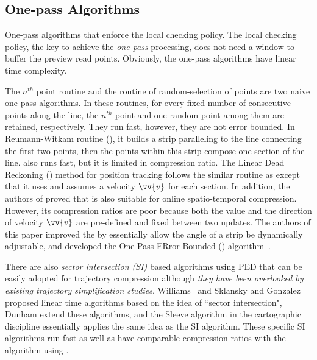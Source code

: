 

\subsection{One-pass Algorithms}


{One-pass algorithms that enforce the local checking policy}.
The local checking policy, the key to achieve the \emph{one-pass} processing, does not need a window to buffer the preview read points.
Obviously, the one-pass algorithms have linear time complexity.

The $n^{th}$ point routine and the routine of random-selection of points \cite{Shi:Survey} are two naive one-pass algorithms.
In these routines, for every fixed number of consecutive points along the line, the $n^{th}$ point and one random point among them are retained, respectively.
They run fast, however, they are not error bounded.
%
In Reumann-Witkam routine (\rwa)\cite{Reumann:Strip}, it builds a strip paralleling to the line connecting the first two points, then the points within this strip compose one section of the line. \rwa also runs fast, but it is limited in compression ratio.
%
The Linear Dead Reckoning (\ldr) method \cite{Lange:Tracking} for position tracking follows the similar routine as \rwa except that it uses \sed and assumes a velocity ${\vv{v}}$ for each section. In addition, the authors of \cite{Trajcevski:DDR} proved that \ldr is also suitable for online spatio-temporal compression. %
However, its compression ratios are poor because both the value and the direction of velocity ${\vv{v}}$ are pre-defined and fixed between two updates.
%
The authors of this paper improved the \rwa by essentially allow the angle of a strip be dynamically adjustable, and developed the One-Pass ERror Bounded (\operb) algorithm~\cite{Lin:Operb}.

There are also \textit{sector intersection (SI)} based algorithms using PED that can be easily adopted for trajectory compression although
\textit{they have been overlooked by existing trajectory simplification studies}.
Williams~\cite{Williams:Longest} and Sklansky and Gonzalez \cite{Sklansky:Cone} proposed linear time algorithms based on the idea of ``sector intersection", Dunham \cite{Dunham:Cone} extend these algorithms, and the Sleeve algorithm \cite{Zhao:Sleeve} in the cartographic discipline
essentially applies the same idea as the SI algorithm.
These \ped specific SI algorithms run fast as well as have comparable compression ratios with the \dpa algorithm using \ped.
%
%

